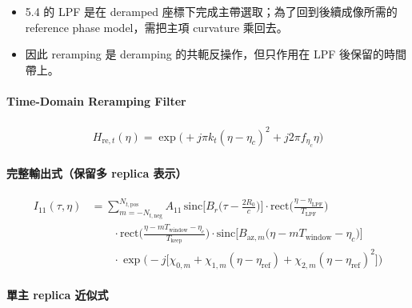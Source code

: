 \documentclass[11pt]{article}
\providecommand{\tightlist}{%
  \setlength{\itemsep}{0pt}\setlength{\parskip}{0pt}}
\begin{document}
\begin{itemize}
\tightlist
\item
  5.4 的 LPF 是在 deramped 座標下完成主帶選取；為了回到後續成像所需的
  reference phase model，需把主項 curvature 乘回去。
\item
  因此 reramping 是 deramping 的共軛反操作，但只作用在 LPF
  後保留的時間帶上。
\end{itemize}

\hypertarget{time-domain-reramping-filter}{%
\paragraph{Time-Domain Reramping
Filter}\label{time-domain-reramping-filter}}

\begin{equation}
\begin{aligned}
H_{\mathrm{re},t}(\eta) = \exp\biggl( +j\pi k_t(\eta-\eta_c)^2 + j2\pi f_{\eta_c}\eta \biggr)
\end{aligned}
\end{equation}

\hypertarget{ux5b8cux6574ux8f38ux51faux5f0fux4fddux7559ux591a-replica-ux8868ux793a-1}{%
\paragraph{完整輸出式（保留多 replica
表示）}\label{ux5b8cux6574ux8f38ux51faux5f0fux4fddux7559ux591a-replica-ux8868ux793a-1}}

\begin{equation}
\begin{aligned}
I_{11}(\tau,\eta)
&=
\sum_{m=-N_{t,\mathrm{neg}}}^{N_{t,\mathrm{pos}}} A_{11}\,
\mathrm{sinc}\biggl[ B_r\biggl( \tau-\frac{2R_0}{c} \biggr) \biggr]
\cdot \mathrm{rect}\biggl( \frac{\eta-\eta_{\mathrm{LPF}}}{T_{\mathrm{LPF}}} \biggr)\\
&\qquad \cdot \mathrm{rect}\biggl( \frac{\eta-mT_{\mathrm{window}}-\eta_c}{T_{\mathrm{keep}}} \biggr)
\cdot \mathrm{sinc}\biggl[ B_{\mathrm{az},m}\biggl( \eta-mT_{\mathrm{window}}-\eta_c \biggr) \biggr]\\
&\qquad \cdot \exp\biggl( -j\biggl[ \chi_{0,m}+\chi_{1,m}(\eta-\eta_{\mathrm{ref}})+\chi_{2,m}(\eta-\eta_{\mathrm{ref}})^2 \biggr] \biggr)
\end{aligned}
\end{equation}

\hypertarget{ux55aeux4e3b-replica-ux8fd1ux4f3cux5f0f-1}{%
\paragraph{單主 replica
近似式}\label{ux55aeux4e3b-replica-ux8fd1ux4f3cux5f0f-1}}
\end{document}
